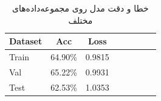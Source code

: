 \begin{table}[h]
	\centering
	\caption{خطا و دقت مدل روی مجموعه‌داده‌های مختلف}
	\label{tab:baseline}
	\begin{latin}
\begin{tabular}{lccccccc}
	\toprule
	Dataset & Acc & Loss  \\
	\midrule
	Train      & 64.90\%          & 0.9815          \\
	Val & 65.22\%          & 0.9931          \\
	Test & 62.53\%          & 1.0353          \\
	
	\bottomrule
\end{tabular}
\end{latin}
\end{table}


